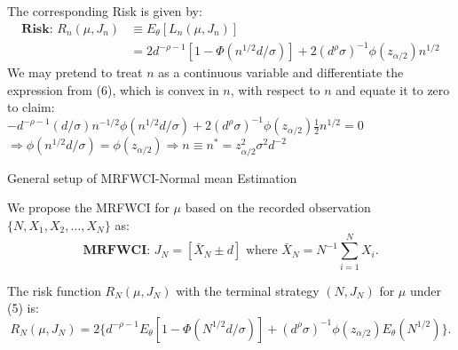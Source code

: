 \documentclass [xcolor=svgnames, t] {beamer}
\begin{document}
\begin{frame}{}
\vspace{10mm}

The corresponding Risk is given by:
    \begin{equation}
    \begin{split}
        \textbf{Risk: } R_n(\mu,J_n)  
        & \equiv E_{\theta}[L_n(\mu,J_n)] \\ 
        &= 2d^{-\rho-1}[1-\Phi(n^{1/2}d/\sigma)]+2(d^{\rho}\sigma)^{-1}\phi(z_{\alpha/2})n^{1/2} 
    \end{split}
    \end{equation}
    We may pretend to treat $n$ as a continuous variable and differentiate the expression
from (6), which is convex in $n$, with respect to $n$ and equate it to zero to claim:\\
    $-d^{-\rho-1}(d/\sigma)n^{-1/2}\phi(n^{1/2}d/\sigma)+2(d^\rho \sigma)^{-1}\phi(z_{\alpha/2})\frac{1}{2}
    n^{1/2}=0$\\
    \vspace{0.1cm}
    $\Rightarrow \phi(n^{1/2}d/\sigma)=\phi(z_{\alpha/2}) \Rightarrow  n \equiv n^*=z^2_{\alpha/2}\sigma^2d^{-2}$
    
\end{frame}
\begin{frame}{General setup of MRFWCI-Normal mean Estimation}

We propose the MRFWCI for $\mu$ based on the recorded observation $\{N,X_1,X_2,\dots ,X_N\}$ as:
    \begin{equation*}
    \textbf{MRFWCI: }J_N=[\bar{X}_N \pm d] \text{ where }\bar{X}_N=N^{-1} \sum_{i=1}^N{X_i}.    
    \end{equation*}
    
    The risk function $R_N(\mu,J_N)$ with the terminal strategy $(N,J_N)$ for $\mu$ under (5) is:
    \begin{equation*}
        R_N(\mu,J_N) = 2\{ d^{-\rho-1} E_{\theta}[1-\Phi(N^{1/2}d/\sigma)]+ (d^{\rho}\sigma)^{-1}\phi(z_{\alpha/2})E_{\theta}(N^{1/2})\}.
    \end{equation*}
    
    
\end{frame}
\end{document}
